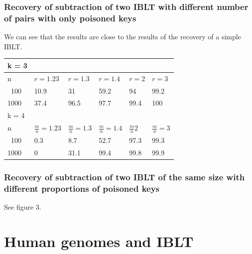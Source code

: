 \documentclass{article}
\begin{document}
\subsubsection{Recovery of subtraction of two IBLT with different number of pairs with only poisoned keys}
We can see that the results are close to the results of the recovery of a simple IBLT. 
\begin{center}
\begin{tabular}{l | l | l | l | l | l} \hline \hline k = 3 \\ \hline
    \hline n & $r = 1.23$ &  $r = 1.3$  &  $r = 1.4$ & $r = 2$ & $r = 3$\\ \hline
    \hline \ 100 & 10.9 & 31 & 59.2 & 94 & 99.2 \\ \hline 
    1000 & 37.4 & 96.5 & 97.7 & 99.4 & 100 \\ \hline
    \hline
    k = 4 \\
    \hline
    \hline n & $\frac{m}{n} = 1.23$ &  $\frac{m}{n} = 1.3$  &  $\frac{m}{n} = 1.4$ & $\frac{m}{n} 2$ & $\frac{m}{n} = 3$\\ \hline
    \hline \ 100 & 0.3 & 8.7 & 52.7 & 97.3 & 99.3 \\ \hline 
    1000 & 0 & 31.1 & 99.4 & 99.8 & 99.9 \\ \hline
\end{tabular}
\end{center}


\subsubsection{Recovery of subtraction of two IBLT of the same size with different proportions of poisoned keys}
See figure 3.

\section{Human genomes and IBLT}
\end{document}
